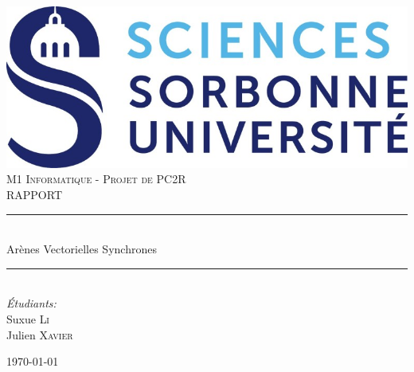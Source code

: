 \documentclass[11pt]{article}
\begin{document}
 
\begin{titlepage}

\newcommand{\HRule}{\rule{\linewidth}{0.5mm}} %

\center %
 

\includegraphics{logo_su.jpg}\\[1cm] 

\textsc{\LARGE M1 Informatique - Projet de PC2R}\\[1.5cm] %
\textsc{\Large RAPPORT}\\[1cm] %


\HRule \\[1cm]
{ \huge Arènes Vectorielles Synchrones}\\[0.4cm] %
\HRule \\[1.5cm]
 
\emph{Étudiants:}\\
Suxue \textsc{Li} \\%
Julien \textsc{Xavier}\\ %
\vspace{6cm}


{\large \today}\\[5cm] %


\end{titlepage}
\end{document}
